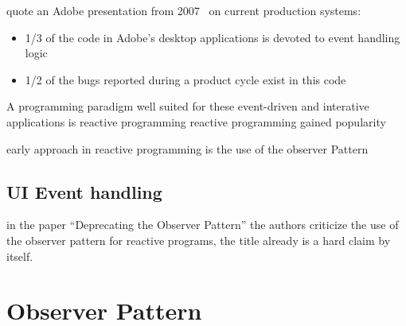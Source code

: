 \documentclass[format=acmtog]{acmart}
\begin{document}
	quote an Adobe presentation from 2007~\cite{parent2006possible} on current production systems:
	\begin{itemize}
		\item 1/3 of the code in Adobe’s desktop applications is devoted to event handling logic	
		\item 1/2 of the bugs reported during a product cycle exist in this code
	\end{itemize}


	
	A programming paradigm well suited for these event-driven and interative applications is reactive programming
	reactive programming gained popularity

	early approach in reactive programming is the use of the observer Pattern
	
	\subsection{UI Event handling}



	in the paper ``Deprecating the Observer Pattern'' the authors criticize the use of the observer pattern for reactive programs,
	the title already is a hard claim by itself.



\section{Observer Pattern}
	\cite{Gamma:1995}
\end{document}
